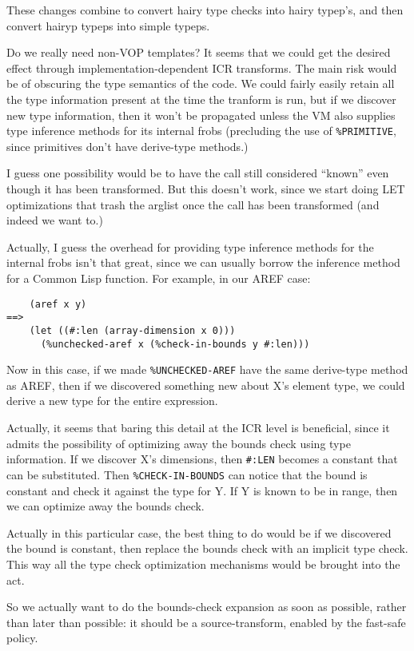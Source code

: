 These changes combine to convert hairy type checks into hairy typep's, and then
convert hairyp typeps into simple typeps.


Do we really need non-VOP templates? It seems that we could get the
desired effect through implementation-dependent ICR transforms. The
main risk would be of obscuring the type semantics of the code. We
could fairly easily retain all the type information present at the
time the tranform is run, but if we discover new type information,
then it won't be propagated unless the VM also supplies type inference
methods for its internal frobs (precluding the use of
\verb|%PRIMITIVE|, since primitives don't have derive-type methods.)

I guess one possibility would be to have the call still considered ``known'' even
though it has been transformed.  But this doesn't work, since we start doing
LET optimizations that trash the arglist once the call has been transformed
(and indeed we want to.)

Actually, I guess the overhead for providing type inference methods for the
internal frobs isn't that great, since we can usually borrow the inference
method for a Common Lisp function.  For example, in our AREF case:

\begin{verbatim}
    (aref x y)
==>
    (let ((#:len (array-dimension x 0)))
      (%unchecked-aref x (%check-in-bounds y #:len)))  
\end{verbatim}

Now in this case, if we made \verb|%UNCHECKED-AREF| have the same
derive-type method as AREF, then if we discovered something new about
X's element type, we could derive a new type for the entire
expression.

Actually, it seems that baring this detail at the ICR level is
beneficial, since it admits the possibility of optimizing away the bounds
check using type information. If we discover X's dimensions, then
\verb|#:LEN| becomes a constant that can be substituted. Then
\verb|%CHECK-IN-BOUNDS| can notice that the bound is constant and
check it against the type for Y. If Y is known to be in range, then we
can optimize away the bounds check.

Actually in this particular case, the best thing to do would be if we
discovered the bound is constant, then replace the bounds check with an
implicit type check.  This way all the type check optimization mechanisms would
be brought into the act.

So we actually want to do the bounds-check expansion as soon as possible,
rather than later than possible: it should be a source-transform, enabled by
the fast-safe policy.

